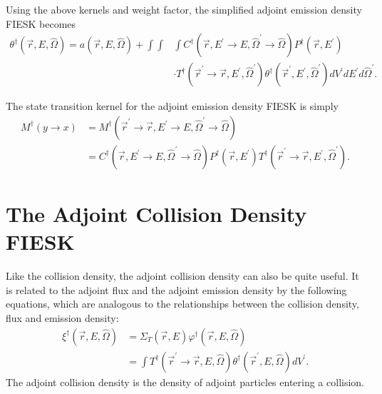 Using the above kernels and weight factor, the simplified adjoint emission
density FIESK becomes
\begin{equation}
  \begin{split}
    \theta^{\dagger}(\vec{r},E,\hat{\Omega}) = a(\vec{r},E,\hat{\Omega}) + 
    \int\int&\int 
    C^{\dagger}(\vec{r},E^{'} \to E,\hat{\Omega}^{'} \to \hat{\Omega}) 
    P^{\dagger}(\vec{r},E^{'}) \\
    & \cdot T^{\dagger}(\vec{r}^{'} \to \vec{r},E^{'},\hat{\Omega}^{'})
    \theta^{\dagger}(\vec{r}^{'},E^{'},\hat{\Omega}^{'})
    dV^{'} dE^{'} d\hat{\Omega}^{'}.
  \end{split}
  \label{eq:adj_emission_dens_int_eqn}
\end{equation}

The state transition kernel for the adjoint emission density FIESK is simply
\begin{align}
  M^{\dagger}(y \to x) & = 
  M^{\dagger}(\vec{r}^{'} \to \vec{r},E^{'} \to E,\hat{\Omega}^{'} \to \hat{\Omega})
  \nonumber \\
  & = C^{\dagger}(\vec{r},E^{'} \to E,\hat{\Omega}^{'} \to \hat{\Omega})
  P^{\dagger}(\vec{r},E^{'})
  T^{\dagger}(\vec{r}^{'} \to \vec{r},E^{'},\hat{\Omega}^{'}).
  \label{eq:adj_emission_dens_kernel}
\end{align}

\section{The Adjoint Collision Density FIESK}
Like the collision density, the adjoint collision density can also be quite
useful. It is related to the adjoint flux and the adjoint emission density by 
the following equations, which are analogous to the relationships between the 
collision density, flux and emission density:
\begin{align}
  \xi^{\dagger}(\vec{r},E,\hat{\Omega}) & = \Sigma_T(\vec{r},E)
  \varphi^{\dagger}(\vec{r},E,\hat{\Omega}) \\
  & = \int T^{\dagger}(\vec{r}^{'} \to \vec{r},E,\hat{\Omega})
  \theta^{\dagger}(\vec{r}^{'},E,\hat{\Omega}) dV^{'}.
  \label{eq:adj_collision_dens_to_adj_emission_dens}
\end{align}
The adjoint collision density is the density of adjoint particles entering a 
collision. 


